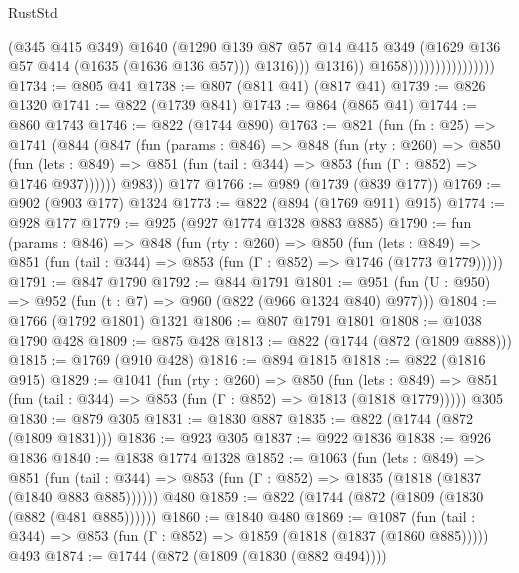 \begin{lexlean}{RustStd}
\begin{coremodule}
{\begin{coremodule}
{{{{{{{{{                                            (@345 @415 @349)
                                            @1640
                                            (@1290
                                              @139
                                              @87
                                              @57
                                              @14
                                              @415
                                              @349
                                              (@1629 @136 @57 @414 (@1635 (@1636 @136 @57)))
                                              @1316)))
                                        @1316))
                                    @1658))))))))))))))))
@1734 := @805 @41
@1738 := @807 (@811 @41) (@817 @41)
@1739 := @826 @1320
@1741 := @822 (@1739 @841)
@1743 := @864 (@865 @41)
@1744 := @860 @1743
@1746 := @822 (@1744 @890)
@1763 := @821
    (fun (fn : @25) =>
    @1741
      (@844
        (@847
          (fun (params : @846) =>
          @848
            (fun (rty : @260) =>
            @850
              (fun (lets : @849) =>
              @851 (fun (tail : @344) => @853 (fun (Γ : @852) => @1746 @937))))))
        @983))
    @177
@1766 := @989 (@1739 (@839 @177))
@1769 := @902 (@903 @177) @1324
@1773 := @822 (@894 (@1769 @911) @915)
@1774 := @928 @177
@1779 := @925 (@927 @1774 @1328 @883 @885)
@1790 := fun (params : @846) =>
  @848
    (fun (rty : @260) =>
    @850
      (fun (lets : @849) =>
      @851 (fun (tail : @344) => @853 (fun (Γ : @852) => @1746 (@1773 @1779)))))
@1791 := @847 @1790
@1792 := @844 @1791
@1801 := @951 (fun (U : @950) => @952 (fun (t : @7) => @960 (@822 (@966 @1324 @840) @977)))
@1804 := @1766 (@1792 @1801) @1321
@1806 := @807 @1791 @1801
@1808 := @1038 @1790 @428
@1809 := @875 @428
@1813 := @822 (@1744 (@872 (@1809 @888)))
@1815 := @1769 (@910 @428)
@1816 := @894 @1815
@1818 := @822 (@1816 @915)
@1829 := @1041
    (fun (rty : @260) =>
    @850
      (fun (lets : @849) =>
      @851 (fun (tail : @344) => @853 (fun (Γ : @852) => @1813 (@1818 @1779)))))
    @305
@1830 := @879 @305
@1831 := @1830 @887
@1835 := @822 (@1744 (@872 (@1809 @1831)))
@1836 := @923 @305
@1837 := @922 @1836
@1838 := @926 @1836
@1840 := @1838 @1774 @1328
@1852 := @1063
    (fun (lets : @849) =>
    @851 (fun (tail : @344) => @853 (fun (Γ : @852) => @1835 (@1818 (@1837 (@1840 @883 @885))))))
    @480
@1859 := @822 (@1744 (@872 (@1809 (@1830 (@882 (@481 @885))))))
@1860 := @1840 @480
@1869 := @1087
    (fun (tail : @344) => @853 (fun (Γ : @852) => @1859 (@1818 (@1837 (@1860 @885)))))
    @493
@1874 := @1744 (@872 (@1809 (@1830 (@882 @494))))
}}}}}}}}}
\end{coremodule}}
\end{coremodule}
\end{lexlean}

